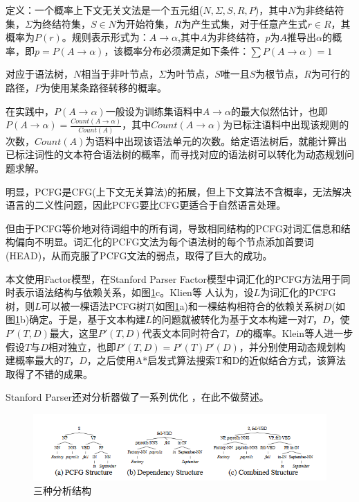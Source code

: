 定义：一个概率上下文无关文法是一个五元组($N,\Sigma ,S,R,P$)，其中$N$为非终结符集，$\Sigma$为终结符集，$S\in N$为开始符集，$R$为产生式集，对于任意产生式$r \in R$，其概率为$P(r)$。规则表示形式为：$A\rightarrow\alpha$,其中$A$为非终结符，$p$为$A$推导出$\alpha$的概率，即$p = P(A\rightarrow\alpha)$，该概率分布必须满足如下条件：$\sum{P(A\rightarrow\alpha)}=1$
\cite{Cha93}\par
对应于语法树，$N$相当于非叶节点，$\Sigma$为叶节点，$S$唯一且$S$为根节点，$R$为可行的路径，$P$为使用某条路径转移的概率。\par
在实践中，$P(A\rightarrow\alpha)$一般设为训练集语料中$A\rightarrow\alpha$的最大似然估计，也即$P(A\rightarrow\alpha) = \frac{Count(A\rightarrow\alpha)}{Count(A)}$，其中$Count(A\rightarrow\alpha)$为已标注语料中出现该规则的次数，$Count(A)$为语料中出现该语法单元的次数。给定语法树后，就能计算出已标注词性的文本符合语法树的概率，而寻找对应的语法树可以转化为动态规划问题求解。\par
明显，PCFG是CFG(上下文无关算法)的拓展，但上下文算法不含概率，无法解决语言的二义性问题，因此PCFG要比CFG更适合于自然语言处理。\par
但由于PCFG等价地对待词组中的所有词，导致相同结构的PCFG对词汇信息和结构偏向不明显。词汇化的PCFG文法为每个语法树的每个节点添加首要词(HEAD)，从而克服了PCFG文法的弱点，取得了巨大的成功\cite{Klein2003b}。\par
本文使用Factor模型，在Stanford Parser Factor模型中词汇化的PCFG方法用于同时表示语法结构与依赖关系，如图\ref{fig:parser1}c。Klien等\cite{Klein2003a} 人认为，设$L$为词汇化的PCFG树，则$L$可以被一棵语法PCFG树$T$(如图\ref{fig:parser1}a)和一棵结构相符合的依赖关系树$D$(如图\ref{fig:parser1}b)确定。于是，基于文本构建$L$的问题就被转化为基于文本构建一对$T$，$D$，使$P'(T,D)$最大，这里$P'(T,D)$代表文本同时符合$T$，$D$的概率。Klein等人进一步假设$T$与$D$相对独立，也即$P'(T,D) = P'(T)P'(D)$，并分别使用动态规划构建概率最大的$T$，$D$，之后使用A*启发式算法搜索T和D的近似结合方式，该算法取得了不错的成果。\par
Stanford Parser还对分析器做了一系列优化\cite{LevyM03} \cite{Marneffe06} \cite{Zhang2011} \cite{ChenM14} \cite{SocherBMN13} \cite{Nivre16} \cite{SchusterM16}，在此不做赘述。
\begin{figure}
\begin{center}
\includegraphics[width=\textwidth]{graphic/parser1.PNG}
\caption{三种分析结构 \label{fig:parser1}}
\end{center}
\end{figure}
